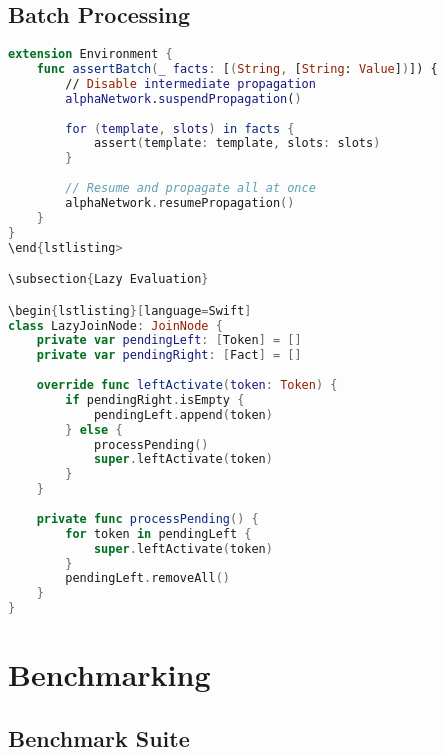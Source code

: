 \subsection{Batch Processing}

\begin{lstlisting}[language=Swift]
extension Environment {
    func assertBatch(_ facts: [(String, [String: Value])]) {
        // Disable intermediate propagation
        alphaNetwork.suspendPropagation()
        
        for (template, slots) in facts {
            assert(template: template, slots: slots)
        }
        
        // Resume and propagate all at once
        alphaNetwork.resumePropagation()
    }
}
\end{lstlisting>

\subsection{Lazy Evaluation}

\begin{lstlisting}[language=Swift]
class LazyJoinNode: JoinNode {
    private var pendingLeft: [Token] = []
    private var pendingRight: [Fact] = []
    
    override func leftActivate(token: Token) {
        if pendingRight.isEmpty {
            pendingLeft.append(token)
        } else {
            processPending()
            super.leftActivate(token)
        }
    }
    
    private func processPending() {
        for token in pendingLeft {
            super.leftActivate(token)
        }
        pendingLeft.removeAll()
    }
}
\end{lstlisting}

\section{Benchmarking}

\subsection{Benchmark Suite}


